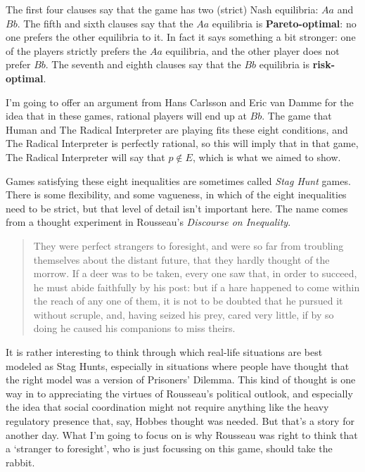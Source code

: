 \documentclass[11pt,]{book}
\begin{document}
The first four clauses say that the game has two (strict) Nash equilibria: \(Aa\) and \(Bb\). The fifth and sixth clauses say that the \(Aa\) equilibria is \textbf{Pareto-optimal}: no one prefers the other equilibria to it. In fact it says something a bit stronger: one of the players strictly prefers the \(Aa\) equilibria, and the other player does not prefer \(Bb\). The seventh and eighth clauses say that the \(Bb\) equilibria is \textbf{risk-optimal}.

I'm going to offer an argument from Hans Carlsson and Eric van Damme \citeyearpar{CarlssonVanDamme1993} for the idea that in these games, rational players will end up at \(Bb\). The game that Human and The Radical Interpreter are playing fits these eight conditions, and The Radical Interpreter is perfectly rational, so this will imply that in that game, The Radical Interpreter will say that \(p \notin E\), which is what we aimed to show.

Games satisfying these eight inequalities are sometimes called \emph{Stag Hunt} games. There is some flexibility, and some vagueness, in which of the eight inequalities need to be strict, but that level of detail isn't important here. The name comes from a thought experiment in Rousseau's \emph{Discourse on Inequality}.

\begin{quote}
They were perfect strangers to foresight, and were so far from troubling themselves about the distant future, that they hardly thought of the morrow. If a deer was to be taken, every one saw that, in order to succeed, he must abide faithfully by his post: but if a hare happened to come within the reach of any one of them, it is not to be doubted that he pursued it without scruple, and, having seized his prey, cared very little, if by so doing he caused his companions to miss theirs. ~\citep[ 209--10]{Rousseau1913}
\end{quote}

It is rather interesting to think through which real-life situations are best modeled as Stag Hunts, especially in situations where people have thought that the right model was a version of Prisoners' Dilemma. This kind of thought is one way in to appreciating the virtues of Rousseau's political outlook, and especially the idea that social coordination might not require anything like the heavy regulatory presence that, say, Hobbes thought was needed. But that's a story for another day. What I'm going to focus on is why Rousseau was right to think that a `stranger to foresight', who is just focussing on this game, should take the rabbit.
\end{document}
